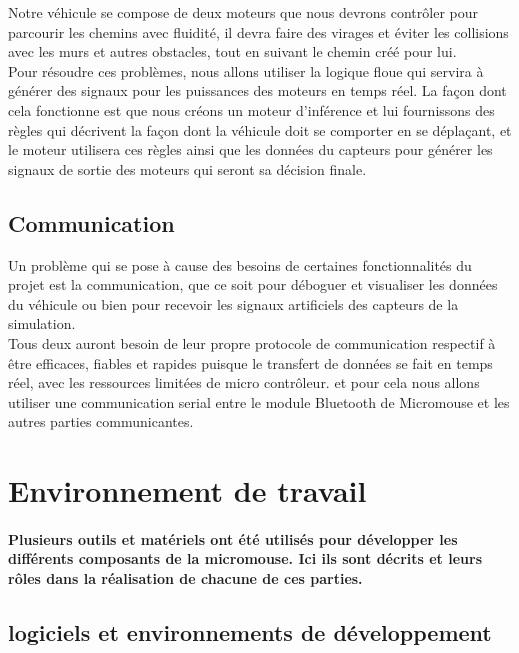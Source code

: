 Notre véhicule se compose de deux moteurs que nous devrons contrôler pour
parcourir les chemins avec fluidité, il devra faire des virages et éviter les
collisions avec les murs et autres obstacles, tout en suivant le chemin créé
pour lui. \\

Pour résoudre ces problèmes, nous allons utiliser la logique floue qui servira
à générer des signaux pour les puissances des moteurs en temps réel. La façon
dont cela fonctionne est que nous créons un moteur d'inférence et lui
fournissons des règles qui décrivent la façon dont la véhicule doit se comporter 
en se déplaçant, et le moteur utilisera ces règles ainsi que les données du
capteurs pour générer les signaux de sortie des moteurs qui seront sa décision
finale.

\subsection{Communication} \label{sec:mapMaze}
Un problème qui se pose à cause des besoins de certaines fonctionnalités du
projet est la communication, que ce soit pour déboguer et visualiser les
données du véhicule ou bien pour recevoir les signaux artificiels des capteurs
de la simulation. \\

Tous deux auront besoin de leur propre protocole de communication respectif
à être efficaces, fiables et rapides puisque le transfert de données se fait en
temps réel, avec les ressources limitées de micro contrôleur. et pour cela nous
allons utiliser une communication serial entre le module Bluetooth de Micromouse
et les autres parties communicantes.

\section{Environnement de travail} \label{sec:environnement}

\paragraph{ 
   Plusieurs outils et matériels ont été utilisés pour développer les
différents composants de la micromouse. Ici ils sont décrits et leurs rôles
dans la réalisation de chacune de ces parties.} \hfill

\subsection{logiciels et environnements de développement} \label{subsec:softDev} 

